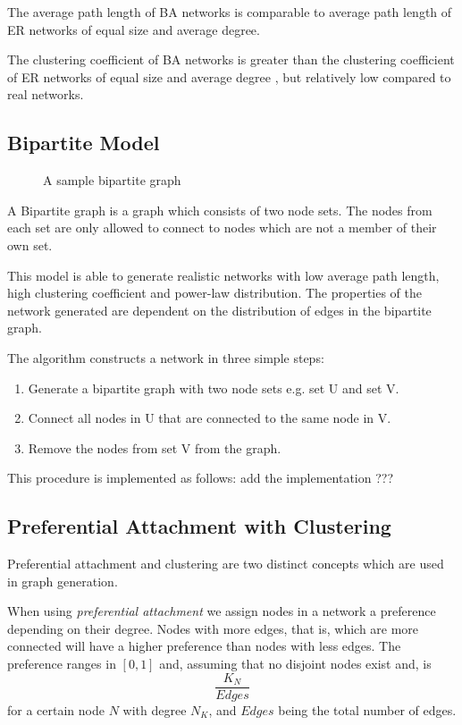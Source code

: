 \documentclass[a4paper,11pt,titlepage]{article}
\begin{document}
The average path length of BA networks is comparable to average path length of
ER networks of equal size and average degree.

The clustering coefficient of BA networks is greater than the clustering
coefficient of ER networks of equal size and average degree \cite{oconn11}, but relatively low
compared to real networks.


\subsection{Bipartite Model}

\begin{figure}
  \begin{center}
    
  \end{center}
  \caption{A sample bipartite graph}
\end{figure}

A Bipartite graph is a graph which consists of two node sets. The nodes from
each set are only allowed to connect to nodes which are not a member of their
own set.

This model is able to generate realistic networks with low average path length,
high clustering coefficient and power-law distribution. The properties of the
network generated are dependent on the distribution of edges in the bipartite
graph.

The algorithm constructs a network in three simple steps:

\begin{enumerate}
   \item Generate a bipartite graph with two node sets e.g. set U and set V.
   \item Connect all nodes in U that are connected to the same node in V.
   \item Remove the nodes from set V from the graph.
\end{enumerate}

This procedure is implemented as follows: add the implementation ???

\subsection{Preferential Attachment with Clustering}

Preferential attachment and clustering are two distinct concepts which are used
in graph generation.

When using \emph{preferential attachment} we assign nodes in a network a preference
depending on their degree. Nodes with more edges, that is, which are more
connected will have a higher preference than nodes with less edges. The
preference ranges in $[0,1]$ and, assuming that no disjoint nodes exist and, is
\[ \frac{K_N}{Edges} \]
for a certain node $N$ with degree $N_K$, and $Edges$ being the total number of
edges.
\end{document}
